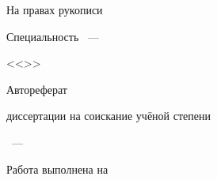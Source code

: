 \newcommand{\sfs}{\fontsize{14pt}{15pt}\selectfont}
\sfs %
\thispagestyle{empty}

\vspace{10mm}
\begin{flushright}
  \Large{На правах рукописи}
\end{flushright}

\vspace{30mm}
\begin{center}
{\Large\bf{\thesisAuthor}}
\end{center}

\vspace{30mm}
\begin{center}
{\bf \LARGE \thesisTitle \par}

\vspace{30mm}
{\Large Специальность \thesisSpecialtyNumber~---\par <<\thesisSpecialtyTitle>>}

\vspace{15mm}
\LARGE{Автореферат}\par
\Large{диссертации на соискание учёной степени\par \thesisDegree}
\end{center}

\vspace{40mm}
\begin{center}
{\Large{\thesisCity~--- \thesisYear}}
\end{center}

\newpage
\thispagestyle{empty}
\noindent Работа выполнена на \thesisOrganization

